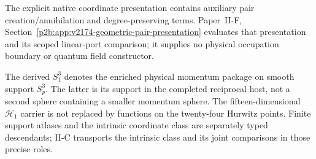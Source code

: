 \documentclass[12pt,a4paper]{article}
\begin{document}
The explicit native coordinate presentation contains auxiliary pair
creation/annihilation and degree-preserving terms. Paper~II-F, Section~\ref{p2b:app:v2174-geometric-pair-presentation}
evaluates that presentation and its scoped linear-port comparison; it
supplies no physical occupation boundary or quantum field constructor.


\begin{remark}
\label{p2b:rem:m8-momentum-package-scope}
The derived \(S_1^3\) denotes the enriched physical momentum package
on smooth support \(S_p^3\).  The latter is its support in the
completed reciprocal host, not a second sphere containing a
smaller momentum sphere.  The fifteen-dimensional \(\mathcal H_1\)
carrier is not replaced by functions on the twenty-four Hurwitz
points.  Finite support atlases and the intrinsic coordinate class
are separately typed descendants; II-C transports the intrinsic
class and its joint comparisons in those precise roles.
\end{remark}
\end{document}

